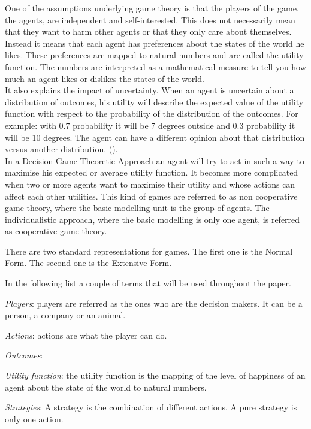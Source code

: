 One of the assumptions underlying game theory is that the players of the game, the agents, are independent and self-interested. This does not necessarily mean that they want to harm other agents or that they only care about themselves. 
Instead it means that each agent has preferences about the states of the world he likes. These preferences are mapped to natural numbers and are called the utility function. The numbers are interpreted as a mathematical measure to tell you how much an agent likes or dislikes the states of the world. \\
It also explains the impact of uncertainty. When an agent is uncertain about a distribution of outcomes, his utility will describe the expected value of the utility function with respect to the probability of the distribution of the outcomes. For example: with 0.7 probability it will be 7 degrees outside and 0.3 probability it will be 10 degrees. The agent can have a different opinion about that distribution versus another distribution. ().\\
In a Decision Game Theoretic Approach an agent will try to act in such a way to maximise his expected or average utility function. It becomes more complicated when two or more agents want to maximise their utility and whose actions can affect each other utilities. This kind of games are referred to as non cooperative game theory, where the basic modelling unit is the group of agents. The individualistic approach, where the basic modelling is only one agent, is referred as cooperative game theory. 

There are two standard representations for games. The first one is the Normal Form. The second one is the Extensive Form.

In the following list a couple of terms that will be used throughout the paper.
\begin{description}
\item \textit{Players}: players are referred as the ones who are the decision makers. It can be a person, a company or an animal. 
\item \textit{Actions}: actions are what the player can do. 
\item \textit{Outcomes}:  
\item \textit{Utility function}: the utility function is the mapping of the level of happiness of an agent about the state of the world to natural numbers.
\item \textit{Strategies}: A strategy is the combination of different actions. A pure strategy is only one action.
\end{description}

